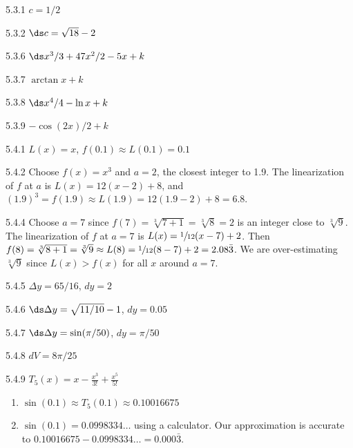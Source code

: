 \begin{Answer}{5.3.1}
 $c=1/2$
\end{Answer}
\begin{Answer}{5.3.2}
 $\ds c=\sqrt{18}-2$
\end{Answer}
\begin{Answer}{5.3.6}
 $\ds x^3/3+47x^2/2-5x+k$
\end{Answer}
\begin{Answer}{5.3.7}
 $\arctan x + k$
\end{Answer}
\begin{Answer}{5.3.8}
 $\ds x^4/4 -\ln x +k$
\end{Answer}
\begin{Answer}{5.3.9}
 $-\cos(2x)/2 +k$
\end{Answer}
\begin{Answer}{5.4.1}
$L(x)=x$, $f(0.1)\approx L(0.1)=0.1$
\end{Answer}
\begin{Answer}{5.4.2}
Choose $f(x)=x^3$ and $a=2$, the closest integer to 1.9. The
linearization of $f$ at $a$ is $L(x)=12(x-2)+8$, and $(1.9)^3=f(1.9)\approx L(1.9)=12(1.9-2)+8=6.8$.
\end{Answer}
\begin{Answer}{5.4.4}
Choose $a=7$ since $f(7)=\sqrt[3]{7+1}=\sqrt[3]{8}=2$ is an integer
close to $\sqrt[3]{9}$. The linearization of $f$ at $a=7$ is
$L(x)=\sfrac{1}{12}(x-7)+2$. Then $f(8)=\sqrt[3]{8+1}=\sqrt[3]{9}\approx L(8)=\sfrac{1}{12}(8-7)+2=2.08\bar{3}$. We are over-estimating $\sqrt[3]{9}$ since $L(x)>f(x)$ for all $x$ around $a=7$.
\end{Answer}
\begin{Answer}{5.4.5}
	$\Delta y=65/16$, $dy=2$
\end{Answer}
\begin{Answer}{5.4.6}
	$\ds \Delta y=\sqrt{11/10}-1$, $dy=0.05$
\end{Answer}
\begin{Answer}{5.4.7}
	$\ds \Delta y=\sin(\pi/50)$, $dy=\pi/50$
\end{Answer}
\begin{Answer}{5.4.8}
	$dV=8\pi/25$
\end{Answer}
\begin{Answer}{5.4.9}
$T_5(x)=x-\frac{x^3}{3!}+\frac{x^5}{5!}$
\begin{enumerate}
	\item	$\sin (0.1)\approx T_5(0.1)\approx 0.10016675$
	\item	$\sin (0.1)=0.0998334\ldots$ using a calculator. Our approximation is accurate to $0.10016675-0.0998334\ldots =0.000\bar{3}$.
\end{enumerate}
\end{Answer}
